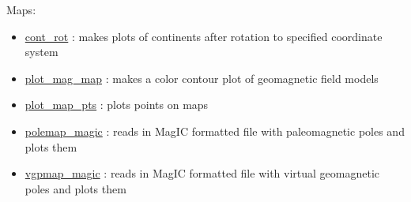 \documentclass[11pt]{book}
\begin{document}
{{\begin{itemize}
\end{itemize}

Maps:

\begin{itemize}

  \item \href{http://pmagpy.github.io/PmagPy.html#cont_rot}{cont\_rot} : makes plots of continents after rotation to specified coordinate system
\item \href{http://pmagpy.github.io/PmagPy.html#plot_mag_map}{plot\_mag\_map} : makes a color contour plot of geomagnetic field models
\item \href{http://pmagpy.github.io/PmagPy.html#plot_map_pts}{plot\_map\_pts} : plots points on maps
\item \href{http://pmagpy.github.io/PmagPy.html#polemap_magic}{polemap\_magic} : reads in MagIC formatted file with paleomagnetic poles and plots them
\item \href{http://pmagpy.github.io/PmagPy.html#vgpmap_magic}{vgpmap\_magic} : reads in MagIC formatted file with virtual geomagnetic poles and plots them

\end{itemize}

}}
\end{document}
